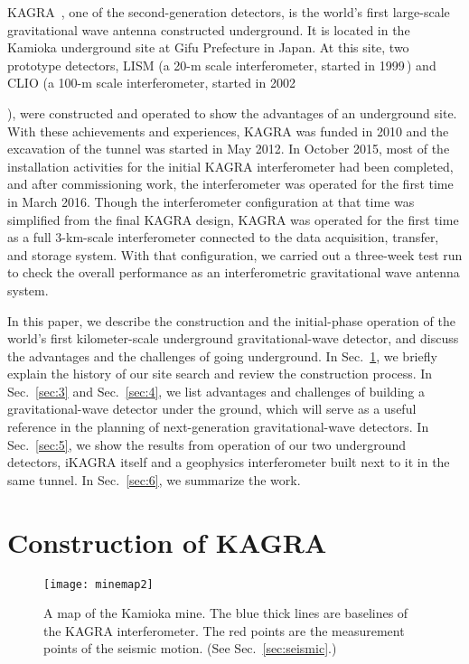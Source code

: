 \documentclass[prd ,twocolumn ,secnumarabic,dvips
,amssymb, amsmath,nobibnotes, aps, prd,superscriptaddress]{revtex4-1}
\begin{document}
KAGRA~\cite{KAGRAname}, one of the second-generation detectors, is the world's first large-scale gravitational wave antenna constructed underground. 
It is located in the Kamioka underground site at Gifu Prefecture in Japan. 
At this site,  two prototype detectors, LISM (a 20-m scale interferometer, started in 1999\,\cite{LISM}) 
and  CLIO (a 100-m scale interferometer, started in 2002\,{\cite{CLIO}\cite{Agatsuma}), were constructed and operated to show 
the advantages of an underground site.
With these achievements and experiences, KAGRA was funded in 2010 and the excavation of the tunnel was started in May 2012.
In October 2015, most of the installation activities for the initial KAGRA interferometer had been completed, and
after commissioning work, the interferometer was operated  for the first time in March 2016.
Though the interferometer configuration at that time was  simplified from the final KAGRA design,
KAGRA was operated for the first time as a full 3-km-scale interferometer connected to  the data acquisition, 
transfer, and storage system.
With that configuration, we carried out a three-week test run to check the overall performance 
as an interferometric gravitational wave antenna system.

In this paper, we describe the construction and the initial-phase operation of the world's first kilometer-scale underground gravitational-wave detector, and discuss the advantages and the challenges of going underground.
In Sec.~\ref{sec:2}, we briefly explain the history of our site search and review the construction process. In Sec.~\ref{sec:3} and Sec.~\ref{sec:4}, we list advantages and challenges of building a gravitational-wave detector under the ground, which will serve as a useful reference in the planning of next-generation gravitational-wave detectors. In Sec.~\ref{sec:5}, we show the results from operation of our two underground detectors, iKAGRA itself and a geophysics interferometer built next to it in the same tunnel. In Sec.~\ref{sec:6}, we summarize the work.


\section{Construction of KAGRA}\label{sec:2}
%
\begin{figure}
\begin{minipage}{8.6cm}
\texttt{[image: minemap2]}
\end{minipage} 
\caption{\label{minemap2}A map of the Kamioka mine. The blue thick lines are baselines of the KAGRA interferometer. The red points are the measurement points of the seismic motion. (See Sec.~\ref{sec:seismic}.)}
\end{figure}

}
\end{document}
